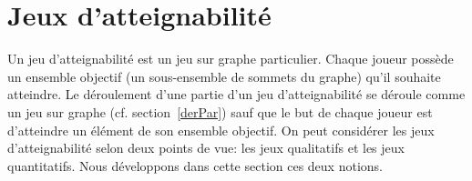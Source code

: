 
\section{Jeux d'atteignabilité}
\label{sect:jeuxAtt}

Un jeu d'atteignabilité est un jeu sur graphe particulier. Chaque joueur possède un ensemble objectif (un sous-ensemble de sommets du graphe) qu'il souhaite atteindre. Le déroulement d'une partie d'un jeu d'atteignabilité se déroule comme un jeu sur graphe (cf. section~\ref{derPar}) sauf que le but de chaque joueur est d'atteindre un élément de son ensemble objectif. On peut considérer les jeux d'atteignabilité selon deux points de vue: les jeux qualitatifs et les jeux quantitatifs. Nous développons dans cette section ces deux notions.






